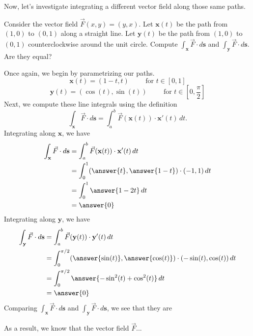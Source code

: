 \documentclass{ximera}
\begin{document}
Now, let's investigate integrating a different vector field along those same paths.

\begin{example}
Consider the vector field $\vec{F}(x,y) = (y,x)$. Let $\textbf{x}(t)$ be the path from $(1,0)$ to $(0,1)$ along a straight line. Let $\textbf{y}(t)$ be the path from $(1,0)$ to $(0,1)$ counterclockwise around the unit circle. Compute $\int_\textbf{x} \vec{F}\cdot d\textbf{s}$ and $\int_\textbf{y} \vec{F}\cdot d\textbf{s}$. Are they equal?

Once again, we begin by parametrizing our paths.
\[
\textbf{x}(t)= (1-t,t)\hspace{1cm}\textrm{for }t\in[0,1]
\]
\[
\textbf{y}(t)= (\cos(t),\sin(t))\hspace{1cm}\textrm{for }t\in[0,\frac{\pi}{2}]
\]
Next, we compute these line integrals using the definition
\[
\int_\textbf{x} \vec{F}\cdot d\textbf{s} = \int_a^b\vec{F}(\textbf{x}(t))\cdot \textbf{x}'(t)\,dt.
\]
Integrating along $\textbf{x}$, we have
\begin{align*}
\int_\textbf{x} \vec{F}\cdot d\textbf{s} &= \int_a^b\vec{F}(\textbf{x}(t))\cdot \textbf{x}'(t)\,dt\\
&= \int_{0}^{1}(\answer{t},\answer{1-t})\cdot(-1, 1)\,dt\\
&= \int_{0}^{1}\answer{1-2t}\,dt\\
&= \answer{0}
\end{align*}
Integrating along $\textbf{y}$, we have
\begin{align*}
\int_\textbf{y} \vec{F}\cdot d\textbf{s} &= \int_a^b\vec{F}(\textbf{y}(t))\cdot \textbf{y}'(t)\,dt\\
&= \int_{0}^{\pi/2}(\answer{\sin(t)},\answer{\cos(t)})\cdot(-\sin(t), \cos(t))\,dt\\
&= \int_{0}^{\pi/2}\answer{-\sin^2(t)+\cos^2(t)}\,dt\\
&= \answer{0}
\end{align*}
Comparing $\int_\textbf{x} \vec{F}\cdot d\textbf{s}$ and $\int_\textbf{y} \vec{F}\cdot d\textbf{s}$, we see that they are
\begin{multipleChoice}
\end{multipleChoice}

As a result, we know that the vector field $\vec{F}$...
\begin{multipleChoice}
\end{multipleChoice}

\end{example}
\end{document}
